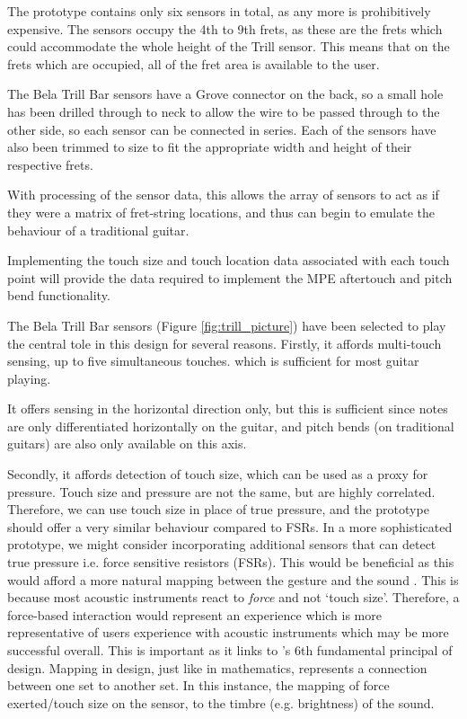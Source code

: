 The prototype contains only six sensors in total, as any more is prohibitively expensive. The sensors occupy the 4th to 9th frets, as these are the frets which could accommodate the whole height of the Trill sensor. This means that on the frets which are occupied, all of the fret area is available to the user. 

The Bela Trill Bar sensors have a Grove connector on the back, so a small hole has been drilled through to neck to allow the wire to be passed through to the other side, so each sensor can be connected in series. Each of the sensors have also been trimmed to size to fit the appropriate width and height of their respective frets. 

With processing of the sensor data, this allows the array of sensors to act as if they were a matrix of fret-string locations, and thus can begin to emulate the behaviour of a traditional guitar.

Implementing the touch size and touch location data associated with each touch point will provide the data required to implement the MPE aftertouch and pitch bend functionality. 

The Bela Trill Bar sensors (Figure \ref{fig:trill_picture}) have been selected to play the central tole in this design for several reasons. Firstly, it affords multi-touch sensing, up to five simultaneous touches. which is sufficient for most guitar playing. 

It offers sensing in the horizontal direction only, but this is sufficient since notes are only differentiated horizontally on the guitar, and pitch bends (on traditional guitars) are also only available on this axis.

Secondly, it affords detection of touch size, which can be used as a proxy for pressure. Touch size and pressure are not the same, but are highly correlated. Therefore, we can use touch size in place of true pressure, and the prototype should offer a very similar behaviour compared to FSRs. In a more sophisticated prototype, we might consider incorporating additional sensors that can detect true pressure i.e. force sensitive resistors (FSRs). This would be beneficial as this would afford a more natural mapping between the gesture and the sound \citep{norman_design_2013}. This is because most acoustic instruments react to \textit{force} and not `touch size'. Therefore, a force-based interaction would represent an experience which is more representative of users experience with acoustic instruments which may be more successful overall. This is important as it links to \cite{norman_design_2013}'s 6th fundamental principal of design. Mapping in design, just like in mathematics, represents a connection between one set to another set. In this instance, the mapping of force exerted/touch size on the sensor, to the timbre (e.g. brightness) of the sound.  


